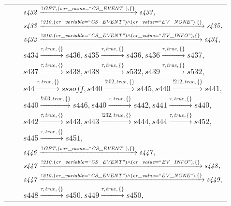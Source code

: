 \begin{tabular}{lcp{350px}}
& & $\mathit{s432}\xrightarrow{\mathit{?GET}, \mathit{(var\_name = ``CS\_EVENT")}, \{\}}\mathit{s433},$ \\
& & $\mathit{s433}\xrightarrow{\mathit{!210}, \mathit{(cr\_variable = ``CS\_EVENT") \land (cr\_value = ``EV\_NONE")}, \{\}}\mathit{s435},$ \\
& & $\mathit{s433}\xrightarrow{\mathit{!210}, \mathit{(cr\_variable = ``CS\_EVENT") \land (cr\_value = ``EV\_INFO")}, \{\}}\mathit{s434},$ \\
& & $\mathit{s434}\xrightarrow{\mathit{\tau}, \mathit{true}, \{\}}\mathit{s436},\mathit{s435}\xrightarrow{\mathit{\tau}, \mathit{true}, \{\}}\mathit{s436},\mathit{s436}\xrightarrow{\mathit{\tau}, \mathit{true}, \{\}}\mathit{s437},$ \\
& & $\mathit{s437}\xrightarrow{\mathit{\tau}, \mathit{true}, \{\}}\mathit{s438},\mathit{s438}\xrightarrow{\mathit{\tau}, \mathit{true}, \{\}}\mathit{s532},\mathit{s439}\xrightarrow{\mathit{\tau}, \mathit{true}, \{\}}\mathit{s532},$ \\
& & $\mathit{s44}\xrightarrow{\mathit{\tau}, \mathit{true}, \{\}}\mathit{sssoff},\mathit{s440}\xrightarrow{\mathit{!502}, \mathit{true}, \{\}}\mathit{s445},\mathit{s440}\xrightarrow{\mathit{!212}, \mathit{true}, \{\}}\mathit{s441},$ \\
& & $\mathit{s440}\xrightarrow{\mathit{!503}, \mathit{true}, \{\}}\mathit{s446},\mathit{s440}\xrightarrow{\mathit{\tau}, \mathit{true}, \{\}}\mathit{s442},\mathit{s441}\xrightarrow{\mathit{\tau}, \mathit{true}, \{\}}\mathit{s440},$ \\
& & $\mathit{s442}\xrightarrow{\mathit{\tau}, \mathit{true}, \{\}}\mathit{s443},\mathit{s443}\xrightarrow{\mathit{!232}, \mathit{true}, \{\}}\mathit{s444},\mathit{s444}\xrightarrow{\mathit{\tau}, \mathit{true}, \{\}}\mathit{s452},$ \\
& & $\mathit{s445}\xrightarrow{\mathit{\tau}, \mathit{true}, \{\}}\mathit{s451},$ \\
& & $\mathit{s446}\xrightarrow{\mathit{?GET}, \mathit{(var\_name = ``CS\_EVENT")}, \{\}}\mathit{s447},$ \\
& & $\mathit{s447}\xrightarrow{\mathit{!210}, \mathit{(cr\_variable = ``CS\_EVENT") \land (cr\_value = ``EV\_INFO")}, \{\}}\mathit{s448},$ \\
& & $\mathit{s447}\xrightarrow{\mathit{!210}, \mathit{(cr\_variable = ``CS\_EVENT") \land (cr\_value = ``EV\_NONE")}, \{\}}\mathit{s449},$ \\
& & $\mathit{s448}\xrightarrow{\mathit{\tau}, \mathit{true}, \{\}}\mathit{s450},\mathit{s449}\xrightarrow{\mathit{\tau}, \mathit{true}, \{\}}\mathit{s450},$ \\

\end{tabular}
